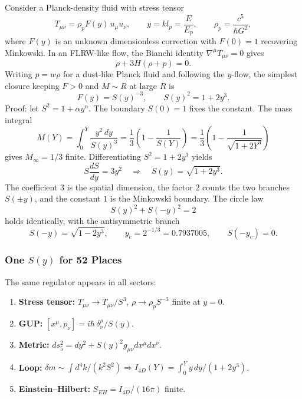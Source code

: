 \documentclass[a4paper,7pt,oneside,openany]{book}
\begin{document}
Consider a Planck-density fluid with stress tensor
\begin{equation}
T_{\mu\nu} = \rho_p F(y)\, u_\mu u_\nu, \qquad y = k l_p = \frac{E}{E_p}, \qquad \rho_p = \frac{c^5}{\hbar G^2},
\label{eq:stress_tensor}
\end{equation}
where \(F(y)\) is an unknown dimensionless correction with \(F(0) = 1\) recovering Minkowski. In an FLRW-like flow, the Bianchi identity \(\nabla^\mu T_{\mu\nu} = 0\) gives
\begin{equation}
\dot\rho + 3H(\rho + p) = 0.
\end{equation}
Writing \(p = w\rho\) for a dust-like Planck fluid and following the \(y\)-flow, the simplest closure keeping \(F > 0\) and \(M \sim R\) at large \(R\) is
\begin{equation}
F(y) = S(y)^{-3}, \qquad S(y)^2 = 1 + 2y^3.
\label{eq:regulator}
\end{equation}
Proof: let \(S^2 = 1 + \alpha y^n\). The boundary \(S(0) = 1\) fixes the constant. The mass integral
\begin{equation}
M(Y) = \int_0^Y \frac{y^2\,dy}{S(y)^3} = \frac{1}{3}\left(1 - \frac{1}{S(Y)}\right) = \frac{1}{3}\left(1 - \frac{1}{\sqrt{1+2Y^3}}\right)
\label{eq:mass_integral}
\end{equation}
gives \(M_\infty = 1/3\) finite. Differentiating \(S^2 = 1 + 2y^3\) yields
\begin{equation}
\boxed{S\frac{dS}{dy} = 3y^2 \quad \Longrightarrow \quad S(y) = \sqrt{1+2y^3}.}
\label{eq:bianchi_solution}
\end{equation}
The coefficient \(3\) is the spatial dimension, the factor \(2\) counts the two branches \(S(\pm y)\), and the constant \(1\) is the Minkowski boundary. The circle law
\begin{equation}
S(y)^2 + S(-y)^2 = 2
\label{eq:circle_law}
\end{equation}
holds identically, with the antisymmetric branch
\begin{equation}
S(-y) = \sqrt{1-2y^3}, \qquad y_c = 2^{-1/3} = 0.7937005, \qquad S(-y_c) = 0.
\end{equation}

\subsubsection{One \(S(y)\) for 52 Places}
\label{sssec:one_S}
The same regulator appears in all sectors:
\begin{enumerate}
\item \textbf{Stress tensor:} \(T_{\mu\nu} \to T_{\mu\nu}/S^3\), \(\rho \to \rho_p S^{-3}\) finite at \(y = 0\).
\item \textbf{GUP:} \([x^\mu, p_\nu] = i\hbar\,\delta^\mu_\nu / S(y)\).
\item \textbf{Metric:} \(ds_5^2 = dy^2 + S(y)^2 g_{\mu\nu}dx^\mu dx^\nu\).
\item \textbf{Loop:} \(\delta m \sim \int d^4k / (k^2 S^2) \Rightarrow I_{4D}(Y) = \int_0^Y y\,dy/(1+2y^3)\).
\item \textbf{Einstein--Hilbert:} \(S_{EH} = I_{4D}/(16\pi)\) finite.
\end{enumerate}
\end{document}

